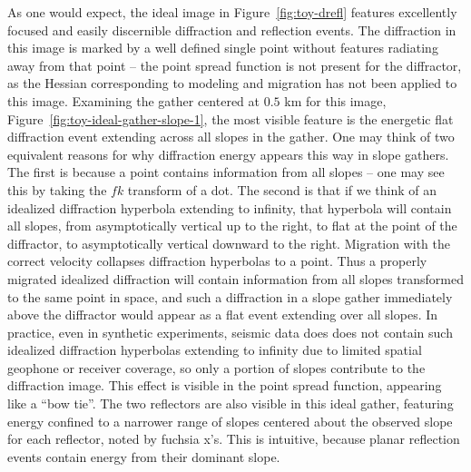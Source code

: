 As one would expect, the ideal image in Figure~\ref{fig:toy-drefl} features excellently focused and easily discernible diffraction and reflection events.  The diffraction in this image is marked by a well defined single point without features radiating away from that point -- the point spread function is not present for the diffractor, as the Hessian corresponding to modeling and migration has not been applied to this image.
 Examining the gather centered at $0.5$ km for this image, Figure~\ref{fig:toy-ideal-gather-slope-1}, the most visible feature is the energetic flat diffraction event extending across all slopes in the gather.  One may think of two equivalent reasons for why diffraction energy appears this way in slope gathers.  The first is because a point contains information from all slopes -- one may see this by taking the $fk$ transform of a dot.  The second is that if we think of an idealized diffraction hyperbola extending to infinity, that hyperbola will contain all slopes, from asymptotically vertical up to the right, to flat at the point of the diffractor, to asymptotically vertical downward to the right.  Migration with the correct velocity collapses diffraction hyperbolas to a point.  Thus a properly migrated idealized diffraction will contain information from all slopes transformed to the same point in space, and such a diffraction in a slope gather immediately above the diffractor would appear as a flat event extending over all slopes.  In practice, even in synthetic experiments, seismic data does does not contain such idealized diffraction hyperbolas extending to infinity due to limited spatial geophone or receiver coverage, so only a portion of slopes contribute to the diffraction image.  This effect is visible in the point spread function, appearing like a ``bow tie''.  The two reflectors are also visible in this ideal gather, featuring energy confined to a narrower range of slopes centered about the observed slope for each reflector, noted by fuchsia x's.  This is intuitive, because planar reflection events contain energy from their dominant slope. 
 
